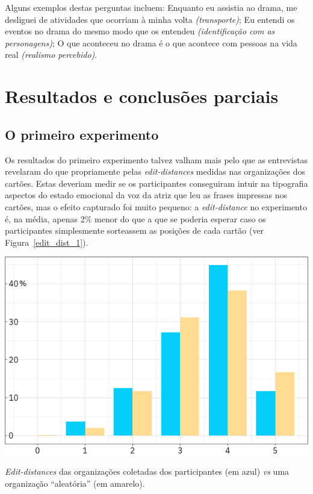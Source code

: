 \documentclass[a4paper]{tufte-handout}
\newcommand{\textls}[2][5]{%
    \begingroup\addfontfeatures{LetterSpace=#1}#2\endgroup
  }
\renewcommand{\smallcapsspacing}[1]{\textls[10]{#1}}
\renewcommand{\textsc}[1]{\smallcapsspacing{\textsmallcaps{#1}}}
\begin{document}
Alguns exemplos destas perguntas incluem: Enquanto eu assistia ao drama, me desliguei de atividades que ocorriam à minha volta \textit{(transporte)}; Eu entendi os eventos no drama do mesmo modo que \textsc{xxx} os entendeu \textit{(identificação com as personagens)}; O que aconteceu no drama é o que acontece com pessoas na vida real \textit{(realismo percebido)}.


\pagebreak 

\section{Resultados e conclusões parciais}\label{sec:resultados}

\subsection{O primeiro experimento}\label{result_prim_exp}

Os resultados do primeiro experimento talvez valham mais pelo que as entrevistas revelaram do que propriamente pelas \textit{edit-distances} medidas nas organizações dos cartões. Estas deveriam medir se os participantes conseguiram intuir na tipografia aspectos do estado emocional da voz da atriz que leu  as frases impressas nos cartões, mas o efeito capturado foi muito pequeno: a \textit{edit-distance} no experimento é, na média, apenas 2\% menor do que a que se poderia esperar caso os participantes simplesmente sorteassem as posições de cada cartão (ver Figura~\ref{edit_dist_1}).

\begin{marginfigure}[-9\baselineskip]
  \includegraphics{imgs/edit_distance_reais.png}
  \caption{\textit{Edit-distances} das organizações coletadas dos participantes (em azul) \textit{vs} uma organização ``aleatória'' (em amarelo).}
  \label{edit_dist_1}
\end{marginfigure}
\end{document}
